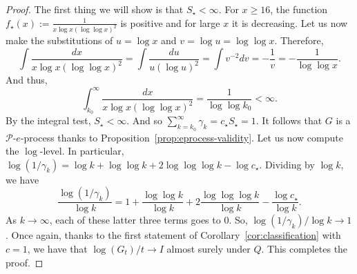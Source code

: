 \documentclass{article}
\newcommand{\PP}{\mathcal P}
\theoremstyle{definition}
\begin{document}
\begin{proof}
The first thing we will show is that $S_{\star}<\infty$. For $x\ge 16$, the function $f_{\star}(x):=\frac{1}{x\log x(\log\log x)^2}$ is positive and for large $x$ it is decreasing. Let us now make the substitutions of $u=\log x$ and $v=\log u=\log\log x$. Therefore,
\[
\int \frac{dx}{x\log x(\log\log x)^2}= \int \frac{du}{u(\log u)^2} = \int v^{-2}dv =-\frac{1}{v}=-\frac{1}{\log\log x}.
\]
And thus,
\[
\int_{k_0}^{\infty} \frac{dx}{x\log x(\log \log x)^2}=\frac{1}{\log \log k_0}<\infty.
\]
By the integral test, $S_{\star}<\infty$. And so $\sum_{k=k_0}^{\infty} \gamma_k=c_{\star}S_{\star}=1$. It follows that $G$ is a $\PP$-$e$-process thanks to Proposition~\ref{prop:eprocess-validity}. Let us now compute the $\log$-level. In particular, $\log(1/\gamma_k)=\log k + \log\log k + 2\log\log\log k - \log c_{\star}$. Dividing by $\log k$, we have
\[
\frac{\log(1/\gamma_k)}{\log k}=1+\frac{\log\log k}{\log k} + 2\frac{\log\log\log k}{\log k}-\frac{\log c_{\star}}{\log k}.
\]
As $k\to\infty$, each of these latter three terms goes to $0$. So, $\log(1/\gamma_k)/\log k \to 1$. Once again, thanks to the first statement of Corollary~\ref{cor:classification} with $c=1$, we have that $\log(G_t)/ t \to I$ almost surely under $Q$. This completes the proof.
\end{proof}
\end{document}
